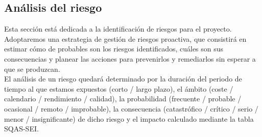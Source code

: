 \documentclass[11pt, a4paper, twoside, titlepage]{article}
\begin{document}
		\subsection{Análisis del riesgo}
		Esta sección está dedicada a la identificación de riesgos para el proyecto. Adoptaremos una estrategia de gestión de riesgos proactiva, que consistirá en estimar cómo de probables son los riesgos identificados, cuáles son sus consecuencias y planear las acciones para prevenirlos y remediarlos sin esperar a que se produzcan.\\
		
		El análisis de un riesgo quedará determinado por la duración del periodo de tiempo al que estamos expuestos (corto / largo plazo), el ámbito (coste / calendario / rendimiento / calidad), la probabilidad (frecuente / probable / ocasional / remoto / improbable), la consecuencia (catastrófico / crítico / serio / menor / insignificante) de dicho riesgo y el impacto calculado mediante la tabla SQAS-SEI.\\
\end{document}
